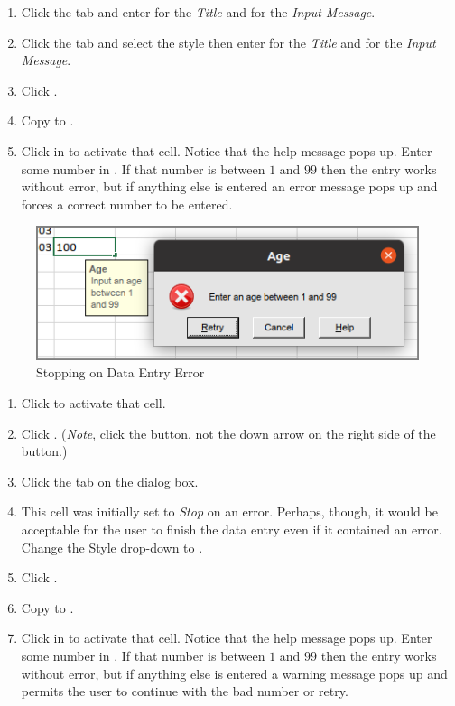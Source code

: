 \begin{enumerate}[resume]	
	\item Click the  tab and enter  for the \textit{Title} and  for the \textit{Input Message}.
	\item Click the  tab and select the  style then enter  for the \textit{Title} and  for the \textit{Input Message}.
	\item Click .
	\item Copy  to .
	\item Click in  to activate that cell. Notice that the help message pops up. Enter some number in . If that number is between $ 1 $ and $ 99 $ then the entry works without error, but if anything else is entered an error message pops up and forces a correct number to be entered.
\end{enumerate}

\begin{figure}[H]
	\centering
	\includegraphics[width=\maxwidth{.95\linewidth}]{gfx/ch07_fig40}
	\caption{Stopping on Data Entry Error}
	\label{07:fig40}
\end{figure}

\begin{enumerate}[resume]	
	\item Click  to activate that cell.
	\item Click . (\textit{Note}, click the button, not the down arrow on the right side of the button.)
	\item Click the  tab on the  dialog box. 
	\item This cell was initially set to \textit{Stop} on an error. Perhaps, though, it would be acceptable for the user to finish the data entry even if it contained an error. Change the Style drop-down to .
	\item Click .
	\item Copy  to .
	\item Click in  to activate that cell. Notice that the help message pops up. Enter some number in . If that number is between $ 1 $ and $ 99 $ then the entry works without error, but if anything else is entered a warning message pops up and permits the user to continue with the bad number or retry.
\end{enumerate}

